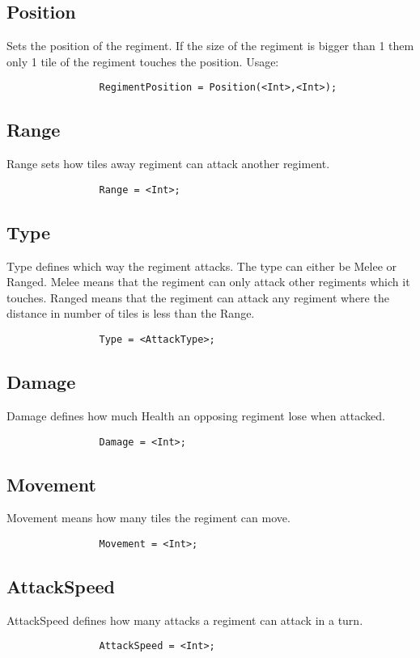 		\subsection{Position}
			Sets the position of the regiment. If the size of the regiment is bigger than 1 them 
			only 1 tile of the regiment touches the position. Usage: 
			\begin{verbatim}
				RegimentPosition = Position(<Int>,<Int>);
			\end{verbatim}
		\subsection{Range}
			Range sets how tiles away regiment can attack another regiment.
			\begin{verbatim}
				Range = <Int>;
			\end{verbatim}
		\subsection{Type}
			Type defines which way the regiment attacks. The type can either be Melee or Ranged.
			Melee means that the regiment can only attack other regiments which it touches. Ranged means 
			that the regiment can attack any regiment where the distance in number of tiles is less than the Range.
			\begin{verbatim}
				Type = <AttackType>; 
			\end{verbatim}	
		\subsection{Damage}
			Damage defines how much Health an opposing regiment lose when attacked.
			\begin{verbatim}
				Damage = <Int>;
			\end{verbatim}
		\subsection{Movement}
			Movement means how many tiles the regiment can move.
			\begin{verbatim}
				Movement = <Int>;
			\end{verbatim}
		\subsection{AttackSpeed}
			AttackSpeed defines how many attacks a regiment can attack in a turn.
			\begin{verbatim}
				AttackSpeed = <Int>;
			\end{verbatim}

